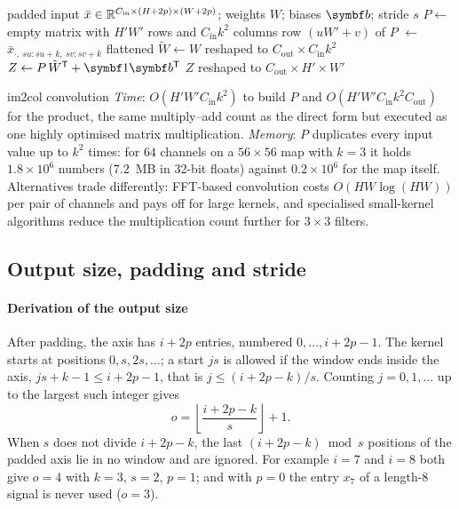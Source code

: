 \documentclass[11pt]{article}
\newcommand{\Cin}{C_{\mathrm{in}}}
\newcommand{\Cout}{C_{\mathrm{out}}}
\newcommand{\Hout}{H'}
\newcommand{\Wout}{W'}
\begin{document}
\begin{algorithm}[htbp]
\caption{Convolution as one matrix product (im2col)}\label{alg:im2col}
\begin{algorithmic}[1]
\Require padded input $\bar x \in \R^{\Cin \times (H + 2p) \times (W + 2p)}$; weights $W$; biases $\vect{b}$; stride $s$
  \State $P \gets$ empty matrix with $\Hout\Wout$ rows and $\Cin k^2$ columns
  \For{$u = 0, \dots, \Hout - 1$; \ $v = 0, \dots, \Wout - 1$}
    \State row $(u\Wout + v)$ of $P$ $\gets$ $\bar x_{\cdot,\ su:su+k,\ sv:sv+k}$ flattened 
  \EndFor
  \State $\tilde W \gets W$ reshaped to $\Cout \times \Cin k^2$
  \State $Z \gets P\,\tilde W\T + \vect{1}\vect{b}\T$ \Comment{one GEMM, $\Hout\Wout \times \Cout$}
  \State \Return $Z$ reshaped to $\Cout \times \Hout \times \Wout$
\EndFunction
\end{algorithmic}
\end{algorithm}

\begin{runtime}{im2col convolution}
\emph{Time}: $O(\Hout\Wout\Cin k^2)$ to build $P$ and $O(\Hout\Wout\Cin k^2\Cout)$ for the product, the same multiply--add
count as the direct form but executed as one highly optimised matrix multiplication. \emph{Memory}: $P$ duplicates every
input value up to $k^2$ times: for $64$ channels on a $56 \times 56$ map with $k = 3$ it holds $1.8 \times 10^6$ numbers
($7.2$~MB in 32-bit floats) against $0.2 \times 10^6$ for the map itself. Alternatives trade differently: FFT-based
convolution costs $O(HW\log(HW))$ per pair of channels and pays off for large kernels, and specialised small-kernel
algorithms reduce the multiplication count further for $3 \times 3$ filters.
\end{runtime}

\subsection{Output size, padding and stride}

\paragraph{Derivation of the output size} After padding, the axis has $i + 2p$ entries, numbered $0, \dots, i + 2p - 1$.
The kernel starts at positions $0, s, 2s, \dots$; a start $js$ is allowed if the window ends inside the axis,
$js + k - 1 \le i + 2p - 1$, that is $j \le (i + 2p - k)/s$. Counting $j = 0, 1, \dots$ up to the largest such integer gives
\begin{equation}\label{eq:osize}
  o = \left\lfloor \frac{i + 2p - k}{s} \right\rfloor + 1 .
\end{equation}
When $s$ does not divide $i + 2p - k$, the last $(i + 2p - k) \bmod s$ positions of the padded axis lie in no window
and are ignored. For example $i = 7$ and $i = 8$ both give $o = 4$ with $k = 3$, $s = 2$, $p = 1$; and with $p = 0$ the
entry $x_7$ of a length-$8$ signal is never used ($o = 3$).
\end{document}
